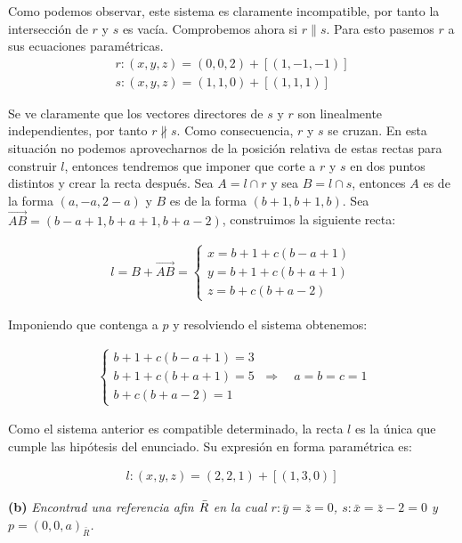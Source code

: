 Como podemos observar, este sistema es claramente incompatible, por tanto la intersección de $r$ y $s$ es vacía. Comprobemos ahora si $r \parallel s$. Para esto pasemos $r$ a sus ecuaciones paramétricas.
\begin{gather*}
    r : (x, y, z) = (0, 0, 2) + [(1, -1, -1)] \\
    s : (x, y, z) = (1, 1, 0) + [(1, 1, 1)]
\end{gather*}

Se ve claramente que los vectores directores de $s$
 y $r$ son linealmente independientes, por tanto $r \nparallel s$. Como consecuencia, $r$ y $s$ se cruzan. En esta situación no podemos aprovecharnos de la posición relativa de estas rectas para construir $l$, entonces tendremos que imponer que corte a $r$ y $s$ en dos puntos distintos y crear la recta después. Sea $A = l \cap r$ y sea $B = l \cap s$, entonces $A$ es de la forma $(a, -a, 2 - a)$ y $B$ es de la forma $(b + 1, b + 1, b)$. Sea $\Vec{AB} = (b - a + 1, b + a + 1, b + a -2)$, construimos la siguiente recta:
 
 \begin{gather*}
    l = B + \Vec{AB} = 
     \begin{cases}
     x = b + 1 + c(b - a + 1) \\
     y = b + 1 + c(b + a + 1) \\
     z = b + c(b + a -2)
     \end{cases}
 \end{gather*}

Imponiendo que contenga a $p$ y resolviendo el sistema obtenemos:

\begin{gather*}
     \begin{cases}
     b + 1 + c(b - a + 1) = 3 \\
     b + 1 + c(b + a + 1) = 5 \\
     b + c(b + a -2) = 1
     \end{cases}
     \ \Longrightarrow \quad a = b = c = 1
 \end{gather*}
 
 Como el sistema anterior es compatible determinado, la recta $l$ es la única que cumple las hipótesis del enunciado. Su expresión en forma paramétrica es: 
 
 \begin{gather*}
    l : (x, y, z) = (2, 2, 1) + [(1, 3, 0)]
 \end{gather*}
 
 \textbf{(b) } \textit{Encontrad una referencia afin $\Bar{R}$ en la cual $r : \bar{y} = \bar{z} = 0$, $s : \bar{x} = \bar{z} - 2 = 0$ y $p = (0, 0, a)_{\bar{R}}$.}
 
